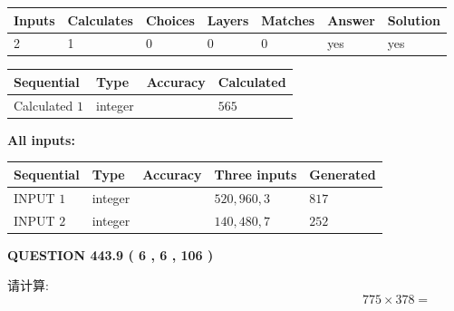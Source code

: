 \documentclass{ctexart}
\begin{document}
 

 
   
   
   
   
\noindent\begin{tabular}{|l|l|l|l|l|l|l|}
 \hline
Inputs & Calculates & Choices & Layers & Matches & Answer & Solution \\ \hline
 2  & 
 1  & 
 0
  & 
 0  & 
 0  & 
  yes & 
  yes 
  \\ \hline
 \end{tabular}
   
   
   
   
\noindent{}
   
   
  
  
\noindent\begin{tabular}{|l|l|l|l|}
\hline
 Sequential & Type & Accuracy & Calculated \\ 
\hline
 
 
  Calculated $  1 $ & integer &  & 
  $ 565 $ 
 \\  \hline  
 \end{tabular}
   
   
   
   
\noindent\vspace{0.1in}\hspace{-0.08in} {\textbf{\Large{All inputs: }}}
   
   
  
  
\noindent\begin{tabular}{|l|l|l|l|l|}
\hline
 Sequential & Type & Accuracy & Three inputs & Generated \\ 
\hline
 
 
  INPUT $  1 $ & integer &  & $
 520
 , 
 960
 , 
 3
 $ & $ 817 $ 
 \\  \hline  
 
 
  INPUT $  2 $ & integer &  & $
 140
 , 
 480
 , 
 7
 $ & $ 252 $ 
 \\  \hline  
 \end{tabular}
   
   
  
\vspace{0.2in}
  
{\textbf{\Large{QUESTION
443.9 
 ( 6 , 6 , 106 )
}}}
  
  
 
请计算:
\begin{equation}
775  \times    %
378 = \nonumber
\end{equation}
 
\end{document}
